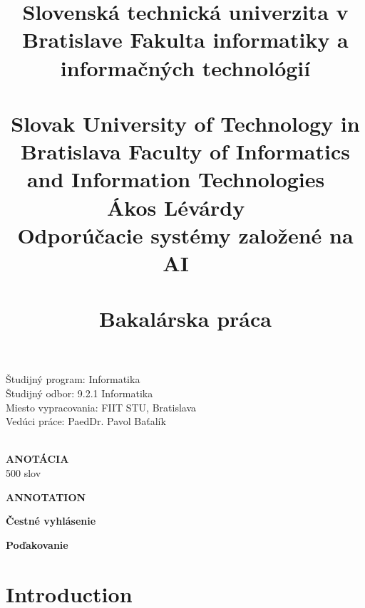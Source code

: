 \documentclass[10pt,oneside,english,a4paper]{article}
\title{\Large \textbf{
Slovenská technická univerzita v Bratislave
Fakulta informatiky a informačných technológií\\
\ \\
Slovak University of Technology in Bratislava
Faculty of Informatics and Information Technologies}
\ \\
\vspace{4\baselineskip}
\Large{ Ákos Lévárdy }
\ \\
\LARGE{ Odporúčacie systémy založené na AI }
\ \\
\ \\
\large{ Bakalárska práca }
}
\begin{document}
\maketitle


\vspace{7\baselineskip} %
\hspace{-2cm} %
\parbox{0.8\textwidth}{
\Large
Študijný program: Informatika\\
Študijný odbor: 9.2.1 Informatika\\
Miesto vypracovania: FIIT STU, Bratislava\\
Vedúci práce: PaedDr. Pavol Baťalík \\\\
}

\newpage{}
\hspace{-2cm}  
\Large \textbf{ANOTÁCIA}\\
500 slov

\newpage{}
\hspace{-2cm} 
\Large \textbf{ANNOTATION}


\newpage{}
\hspace{-2cm} 
\Large \textbf{Čestné vyhlásenie}


\newpage{}
\hspace{-2cm} 
\Large \textbf{Poďakovanie}

\newpage{}
\tableofcontents


\newpage{}
\section{Introduction}




















\clearpage
\normalsize



\nocite{*}
\end{document}
